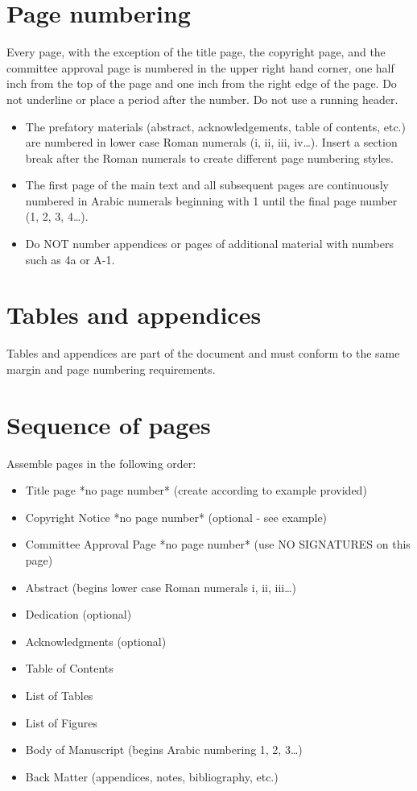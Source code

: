 \section{Page numbering}
Every page, with the exception of the title page, the copyright page, and the committee approval page is numbered in the upper right hand corner, one half inch from the top of the page and one inch from the right edge of the page. Do not underline or place a period after the number. Do not use a running header. \\
\begin{itemize}
    \item The prefatory materials (abstract, acknowledgements, table of contents, etc.) are numbered in lower case Roman numerals (i, ii, iii, iv…). Insert a section break after the Roman numerals to create different page numbering styles.
    \item The first page of the main text and all subsequent pages are continuously numbered in Arabic numerals beginning with 1 until the final page number (1, 2, 3, 4…).
    \item Do NOT number appendices or pages of additional material with numbers such as 4a or A-1.
\end{itemize}

\section{Tables and appendices}
Tables and appendices are part of the document and must conform to the same margin and page numbering requirements.

\section{Sequence of pages}
Assemble pages in the following order:

\begin{itemize}
    \item Title page *no page number* (create according to example provided)
    \item Copyright Notice *no page number* (optional - see example)
    \item Committee Approval Page *no page number* (use\cite{unr-2020-forms} NO SIGNATURES on this page)
    \item Abstract (begins lower case Roman numerals i, ii, iii…)
    \item Dedication (optional)
    \item Acknowledgments (optional)
    \item Table of Contents
    \item List of Tables
    \item List of Figures
    \item Body of Manuscript (begins Arabic numbering 1, 2, 3…)
    \item Back Matter (appendices, notes, bibliography, etc.)
\end{itemize}


